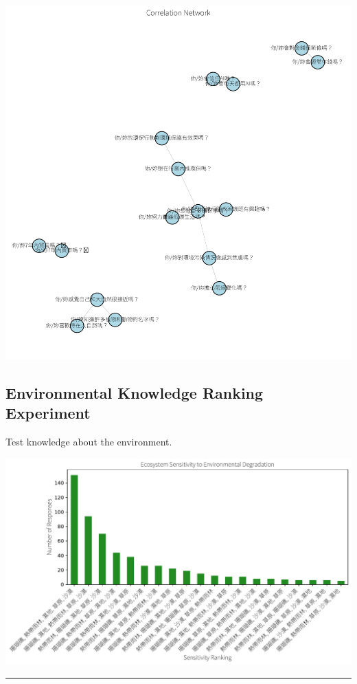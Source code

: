 \documentclass[
  letterpaper,
  DIV=11,
  numbers=noendperiod]{scrartcl}
\begin{document}
\includegraphics{_thesis_files/figure-pdf/cell-18-output-1.pdf}

\subsection{Environmental Knowledge Ranking
Experiment}\label{environmental-knowledge-ranking-experiment}

Test knowledge about the environment.

\includegraphics{_thesis_files/figure-pdf/cell-19-output-1.pdf}

\begin{center}\rule{0.5\linewidth}{0.5pt}\end{center}
\end{document}
